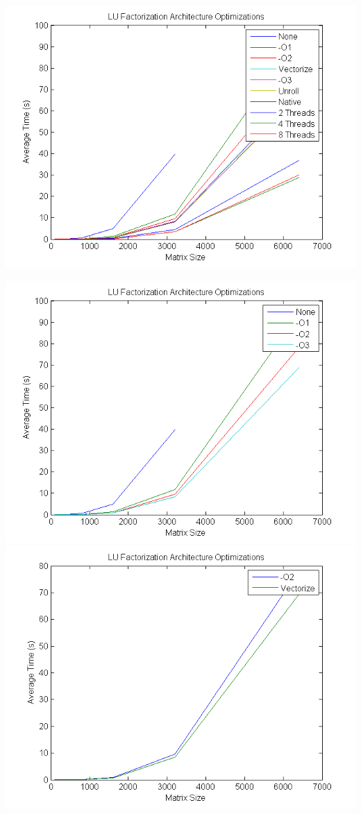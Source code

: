 \documentclass[12]{article}
\begin{document}
\includegraphics[scale=1]{figures/fig1}

\includegraphics[scale=0.5]{figures/fig2}
\includegraphics[scale=0.5]{figures/fig3}
\end{document}
